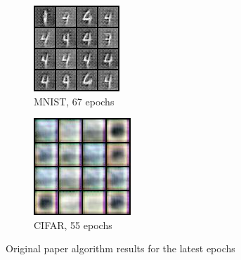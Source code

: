 \documentclass{article}
\begin{document}
    \begin{center}
        \begin{figure}[H]{\textwidth}
            \begin{subfigure}{0.5\textwidth}
                \centering
                \includegraphics[width=0.5\linewidth]{figures/samples_67.jpg}
                \caption{MNIST, 67 epochs}
            \end{subfigure}
            \begin{subfigure}{0.5\textwidth}
                \centering
                \includegraphics[width=0.5\linewidth]{figures/samples_55.jpg}
                \caption{CIFAR, 55 epochs}
            \end{subfigure}%
            \caption{Original paper algorithm results for the latest epochs}
        \end{figure}
    \end{center}
\end{document}
